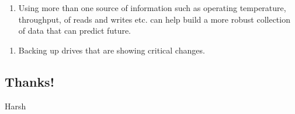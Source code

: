 \documentclass[11pt]{article}
\providecommand{\tightlist}{%
      \setlength{\itemsep}{0pt}\setlength{\parskip}{0pt}}
\begin{document}
\begin{enumerate}
\def\labelenumi{\alph{enumi}.}
\tightlist
\item
  Using more than one source of information such as operating
  temperature, throughput, of reads and writes etc. can help build a
  more robust collection of data that can predict future.
\end{enumerate}

\begin{enumerate}
\def\labelenumi{\arabic{enumi}.}
\setcounter{enumi}{2}
\tightlist
\item
  Backing up drives that are showing critical changes.
\end{enumerate}

    \subsection{Thanks!}\label{thanks}

Harsh


    
    
    
    
\end{document}
